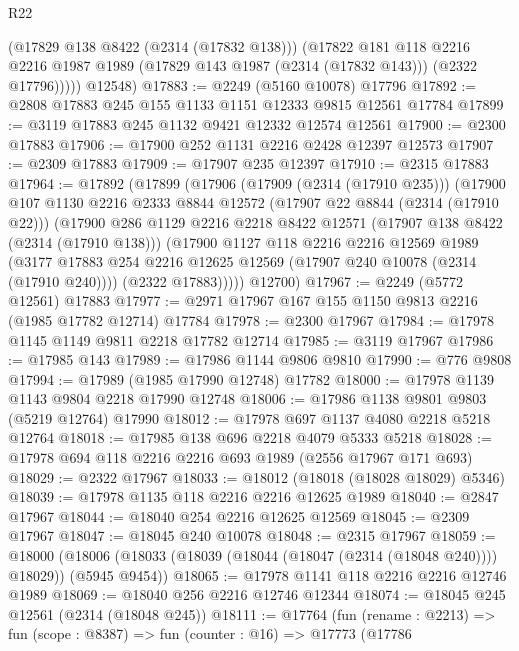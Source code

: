 \begin{lexlean}{R22}
\begin{coremodule}
            (@17829 @138 @8422 (@2314 (@17832 @138)))
            (@17822
              @181
              @118
              @2216
              @2216
              @1987
              @1989
              (@17829 @143 @1987 (@2314 (@17832 @143)))
              (@2322 @17796)))))
      @12548)
@17883 := @2249 (@5160 @10078) @17796
@17892 := @2808 @17883 @245 @155 @1133 @1151 @12333 @9815 @12561 @17784
@17899 := @3119 @17883 @245 @1132 @9421 @12332 @12574 @12561
@17900 := @2300 @17883
@17906 := @17900 @252 @1131 @2216 @2428 @12397 @12573
@17907 := @2309 @17883
@17909 := @17907 @235 @12397
@17910 := @2315 @17883
@17964 := @17892
    (@17899
      (@17906
        (@17909 (@2314 (@17910 @235)))
        (@17900
          @107
          @1130
          @2216
          @2333
          @8844
          @12572
          (@17907 @22 @8844 (@2314 (@17910 @22)))
          (@17900
            @286
            @1129
            @2216
            @2218
            @8422
            @12571
            (@17907 @138 @8422 (@2314 (@17910 @138)))
            (@17900
              @1127
              @118
              @2216
              @2216
              @12569
              @1989
              (@3177 @17883 @254 @2216 @12625 @12569 (@17907 @240 @10078 (@2314 (@17910 @240))))
              (@2322 @17883)))))
      @12700)
@17967 := @2249 (@5772 @12561) @17883
@17977 := @2971 @17967 @167 @155 @1150 @9813 @2216 (@1985 @17782 @12714) @17784
@17978 := @2300 @17967
@17984 := @17978 @1145 @1149 @9811 @2218 @17782 @12714
@17985 := @3119 @17967
@17986 := @17985 @143
@17989 := @17986 @1144 @9806 @9810
@17990 := @776 @9808
@17994 := @17989 (@1985 @17990 @12748) @17782
@18000 := @17978 @1139 @1143 @9804 @2218 @17990 @12748
@18006 := @17986 @1138 @9801 @9803 (@5219 @12764) @17990
@18012 := @17978 @697 @1137 @4080 @2218 @5218 @12764
@18018 := @17985 @138 @696 @2218 @4079 @5333 @5218
@18028 := @17978 @694 @118 @2216 @2216 @693 @1989 (@2556 @17967 @171 @693)
@18029 := @2322 @17967
@18033 := @18012 (@18018 (@18028 @18029) @5346)
@18039 := @17978 @1135 @118 @2216 @2216 @12625 @1989
@18040 := @2847 @17967
@18044 := @18040 @254 @2216 @12625 @12569
@18045 := @2309 @17967
@18047 := @18045 @240 @10078
@18048 := @2315 @17967
@18059 := @18000
    (@18006 (@18033 (@18039 (@18044 (@18047 (@2314 (@18048 @240)))) @18029)) (@5945 @9454))
@18065 := @17978 @1141 @118 @2216 @2216 @12746 @1989
@18069 := @18040 @256 @2216 @12746 @12344
@18074 := @18045 @245 @12561 (@2314 (@18048 @245))
@18111 := @17764
    (fun (rename : @2213) =>
    fun (scope : @8387) =>
    fun (counter : @16) =>
    @17773
      (@17786

\end{coremodule}
\end{lexlean}
